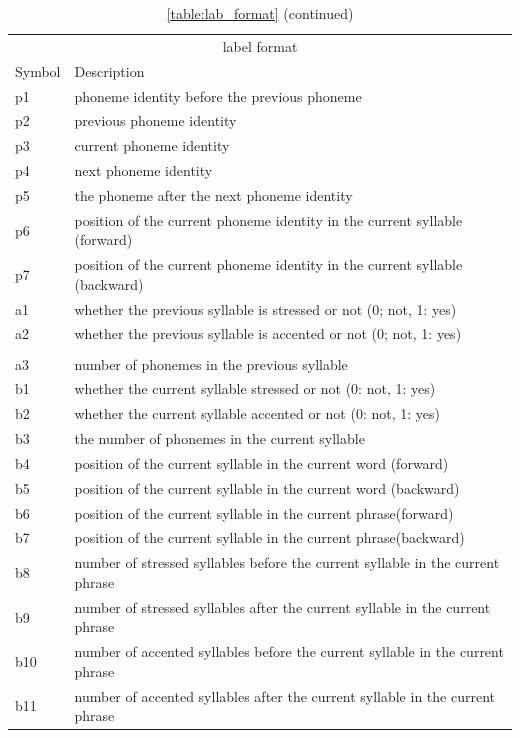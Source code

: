 \begin{longtable}[!htpb]{p{} p{}}
\toprule
\multicolumn{2}{c}{label format} \\
\cline{1-2}
Symbol    & Description \\
\midrule
p1      & phoneme identity before the previous phoneme \\
p2      & previous phoneme identity \\
p3      & current phoneme identity \\
p4		& next phoneme identity \\
p5		& the phoneme after the next phoneme identity \\
p6		& position of the current phoneme identity in the current syllable (forward) \\
p7		& position of the current phoneme identity in the current syllable (backward) \\
\midrule
a1 & whether the previous syllable is stressed or not (0; not, 1: yes)\\
a2 & whether the previous syllable is accented or not (0; not, 1: yes)\\
\caption*{\tablename{} \ref{table:lab_format} (continued)}\\
\toprule
a3 & number of phonemes in the previous syllable \\
b1 & whether the current syllable stressed or not (0: not, 1: yes)\\
b2 & whether the current syllable accented or not (0: not, 1: yes)\\
b3 & the number of phonemes in the current syllable\\
b4 & position of the current syllable in the current word (forward)\\
b5 & position of the current syllable in the current word (backward)\\
b6 & position of the current syllable in the current phrase(forward)\\
b7 & position of the current syllable in the current phrase(backward)\\
b8 & number of stressed syllables before the current syllable in the current phrase\\
b9 & number of stressed syllables after the current syllable in the current phrase\\
b10 & number of accented syllables before the current syllable in the current phrase\\
b11 & number of accented syllables after the current syllable in the current phrase\\

\end{longtable}
